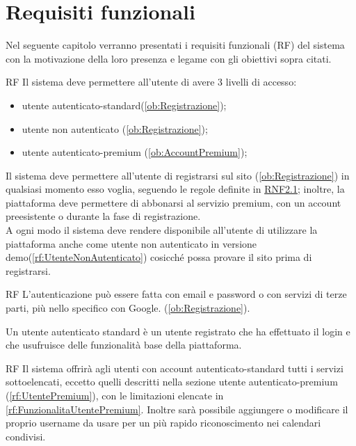 \section{Requisiti funzionali}
\label{sec:RequisitiFunzionali}

Nel seguente capitolo verranno presentati i requisiti funzionali (RF) del sistema con la motivazione della loro presenza e legame con gli obiettivi sopra citati.

\begin{listaPersonale}{RF}
	 Il sistema deve permettere all'utente di avere 3 livelli di accesso:
	\begin{itemize}
		\item utente autenticato-standard(\ref{ob:Registrazione});
		\item utente non autenticato (\ref{ob:Registrazione});
		\item utente autenticato-premium (\ref{ob:AccountPremium});
	\end{itemize}
	Il sistema deve permettere all'utente di registrarsi sul sito (\ref{ob:Registrazione}) in qualsiasi momento esso voglia, seguendo le regole definite in \hyperref[rnf:SicurezzaPassword]{RNF2.1}; inoltre, la piattaforma deve permettere di abbonarsi al servizio premium, con un account preesistente o durante la fase di registrazione.\\
	A ogni modo il sistema deve rendere disponibile all'utente di utilizzare la piattaforma anche come utente non autenticato in versione demo(\ref{rf:UtenteNonAutenticato}) cosicché possa provare il sito prima di registrarsi.

	\begin{listaPersonale2}{RF}
		 L'autenticazione può essere fatta con email e password o con servizi di terze parti, più nello specifico con Google. (\ref{ob:Registrazione}).
	\end{listaPersonale2}

	 Un utente autenticato standard è un utente registrato che ha effettuato il login e che usufruisce delle funzionalità base della piattaforma.

	\begin{listaPersonale2}{RF}
		 Il sistema offrirà agli utenti con account autenticato-standard tutti i servizi sottoelencati, eccetto quelli descritti nella sezione utente autenticato-premium (\ref{rf:UtentePremium}), con le limitazioni elencate in \ref{rf:FunzionalitaUtentePremium}. Inoltre sarà possibile aggiungere o modificare il proprio username da usare per un più rapido riconoscimento nei calendari condivisi.


\end{listaPersonale2}
\end{listaPersonale}
